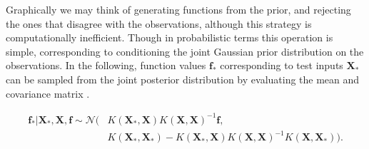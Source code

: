 \documentclass[../../../main.tex]{subfiles}
\begin{document}
Graphically we may think of generating functions from the prior, and rejecting the ones that disagree with the observations, although this strategy is computationally inefficient. Though in probabilistic terms this operation is simple, corresponding to conditioning the joint Gaussian prior distribution on the observations. In the following, function values $\bm{f}_\ast$ corresponding to test inputs $\bm{X}_\ast$ can be sampled from the joint posterior distribution by evaluating the mean and covariance matrix \autocite{Rasmussen2005}.

\begin{equation}
\begin{split}
\bm{f}_\ast|\bm{X}_\ast,\bm{X},\bm{f}
\sim\mathcal{N}(&K(\bm{X}_\ast,\bm{X})K(\bm{X},\bm{X})^{-1}\bm{f},\\
&K(\bm{X}_\ast,\bm{X}_\ast)-K(\bm{X}_\ast,\bm{X})K(\bm{X},\bm{X})^{-1}K(\bm{X},\bm{X}_\ast)).
\end{split}
\end{equation}
\end{document}
